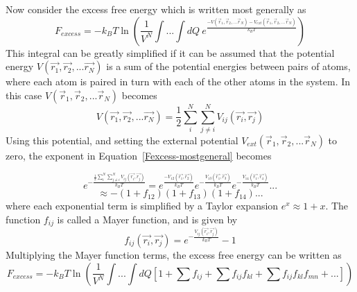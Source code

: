 \documentclass[double,12pt]{beavtex}
\begin{document}
Now consider the excess free energy which is written most generally as
\begin{equation}\label{Fexcess-mostgeneral}{F_{excess}= -k_BT\ln{\left(\frac{1}{V^N}\int{...}\int{dQ}~e^\frac{-V(\vec{r}_1, \vec{r}_2,...\vec{r}_N)-V_{ext}(\vec{r}_1, \vec{r}_2,...\vec{r}_N)}{k_BT}\right)}}\end{equation} 
This integral can be greatly simplified if it can be assumed that the 
potential energy $V(\vec{r_1},\vec{r_2},...\vec{r_N})$ is a sum of the 
potential energies between pairs of atoms, where each atom is paired in 
turn with each of the other atoms in the system. In this case 
$V(\vec{r}_1, \vec{r}_2,...\vec{r}_N)$ becomes 
\begin{equation}{V(\vec{r_1},\vec{r_2},...\vec{r_N})=\frac{1}{2}\sum^N_i\sum^N_{j\neq{i}}V_{ij}(\vec{r_i},\vec{r_j})}\end{equation} 
Using this potential, and setting the external potential 
$V_{ext}(\vec{r}_1, \vec{r}_2,...\vec{r}_N)$ to zero, the exponent in 
Equation~\ref{Fexcess-mostgeneral} becomes

\begin{displaymath}{e^{-\frac{\frac{1}{2}\sum^N_i\sum^N_{j\neq{i}}V_{ij}(\vec{r_i},\vec{r_j})}{k_BT}}=e^{\frac{-V_{12}(\vec{r_1},\vec{r_2})}{k_BT}}e^{-\frac{V_{13}(\vec{r_1},\vec{r_3})}{k_BT}}e^{-\frac{V_{14}(\vec{r_1},\vec{r_4})}{k_BT}}...}\end{displaymath}    \begin{equation}{\approx-(1+f_{12})(1+f_{13})(1+f_{14})...}\end{equation}
where each exponential term is simplified by a Taylor expansion $e^x\approx{1+x}$. 
The function $f_{ij}$ is called a Mayer function, and is given by
\begin{equation}{f_{ij}(\vec{r_i},\vec{r_j})=e^{-\frac{V_{ij}(\vec{r_i},\vec{r_j})}{k_BT}}-1}\end{equation} 
Multiplying the Mayer function terms, the excess free energy can be written as
\begin{equation}\label{eq:Fexcess-simplified}{F_{excess}=-k_BT\ln{\left(\frac{1}{V^N}\int{...}\int{dQ}\left[1 + \sum{f_{ij}} + \sum{f_{ij}f_{kl}} +\sum{f_{ij}f_{kl}f_{mn}} +... \right]\right)  }}\end{equation}
\end{document}
